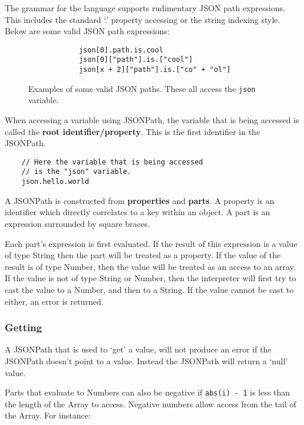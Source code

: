 The grammar for the language supports rudimentary JSON path expressions. This includes the standard `.' property accessing or the string indexing style. Below are some valid JSON path expressions:

\begin{figure}[H]
    \begin{center}
        \begin{verbatim}
            json[0].path.is.cool
            json[0]["path"].is.["cool"]
            json[x + 2]["path"].is.["co" + "ol"]
        \end{verbatim}
    \end{center}
    \vspace{-1.5em}
    \cprotect\caption{Examples of some valid JSON paths. These all access the \verb|json| variable.}
\end{figure}

When accessing a variable using JSONPath, the variable that is being accessed is called the \textbf{root identifier/property}. This is the first identifier in the JSONPath.

\begin{verbatim}
    // Here the variable that is being accessed
    // is the "json" variable.
    json.hello.world
\end{verbatim}

A JSONPath is constructed from \textbf{properties} and \textbf{parts}. A property is an identifier which directly correlates to a key within an object. A part is an expression surrounded by square braces.

Each part's expression is first evaluated. If the result of this expression is a value of type String then the part will be treated as a property. If the value of the result is of type Number, then the value will be treated as an access to an array. If the value is not of type String or Number, then the interpreter will first try to cast the value to a Number, and then to a String. If the value cannot be cast to either, an error is returned.

\subsubsection{Getting}
\label{sec:jsonpath-getting}

A JSONPath that is used to `get' a value, will not produce an error if the JSONPath doesn't point to a value. Instead the JSONPath will return a `null' value.

Parts that evaluate to Numbers can also be negative if \verb|abs(i) - 1| is less than the length of the Array to access. Negative numbers allow access from the tail of the Array. For instance:

